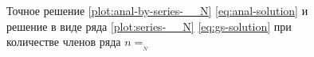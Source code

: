 
\begin{figure}[htb]
  \centering
  \caption{Точное решение \ref{plot:anal-by-series-__N}
    \eqref{eq:anal-solution} и решение в виде ряда
    \ref{plot:series-__N} \eqref{eq:gs-solution} при количестве членов
    ряда $n=__N$}
  \label{fig:series-plot}
\end{figure}
